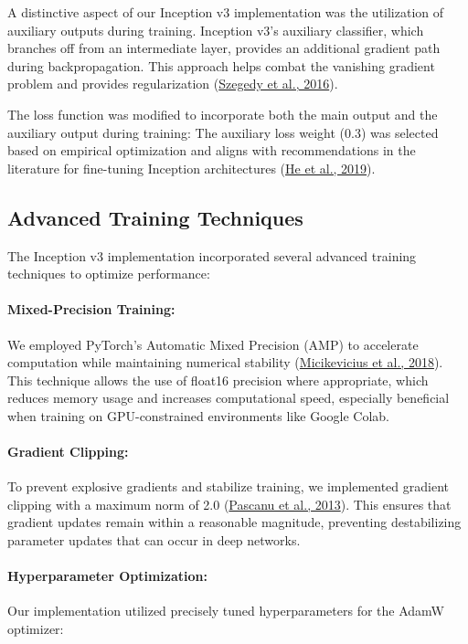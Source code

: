 \documentclass[a4paper,12pt]{article}
\begin{document}
A distinctive aspect of our Inception v3 implementation was the utilization of auxiliary outputs during training. Inception v3’s auxiliary classifier, which branches off from an intermediate layer, provides an additional gradient path during backpropagation. This approach helps combat the vanishing gradient problem and provides regularization (\href{https://arxiv.org/abs/1512.00567}{Szegedy et al., 2016}).

The loss function was modified to incorporate both the main output and the auxiliary output during training:
The auxiliary loss weight (0.3) was selected based on empirical optimization and aligns with recommendations in the literature for fine-tuning Inception architectures (\href{https://arxiv.org/abs/1902.04103}{He et al., 2019}).

\subsection*{Advanced Training Techniques}
The Inception v3 implementation incorporated several advanced training techniques to optimize performance:

\paragraph*{Mixed-Precision Training:} We employed PyTorch’s Automatic Mixed Precision (AMP) to accelerate computation while maintaining numerical stability (\href{https://arxiv.org/abs/1710.03740}{Micikevicius et al., 2018}). This technique allows the use of float16 precision where appropriate, which reduces memory usage and increases computational speed, especially beneficial when training on GPU-constrained environments like Google Colab.

\paragraph*{Gradient Clipping:} To prevent explosive gradients and stabilize training, we implemented gradient clipping with a maximum norm of 2.0 (\href{https://arxiv.org/abs/1211.5063}{Pascanu et al., 2013}). This ensures that gradient updates remain within a reasonable magnitude, preventing destabilizing parameter updates that can occur in deep networks.

\paragraph*{Hyperparameter Optimization:} Our implementation utilized precisely tuned hyperparameters for the AdamW optimizer:
\end{document}
